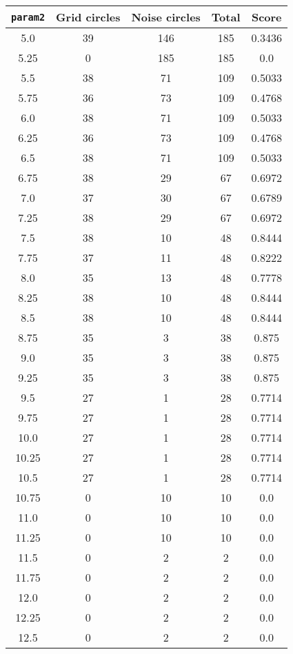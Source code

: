 \documentclass[letterpaper, 12pt]{article}
\begin{document}
\begin{longtable}{|c|c|c|c|c|}
\hline
\textbf{\texttt{param2}} & \textbf{Grid circles} & \textbf{Noise circles} & \textbf{Total} & \textbf{Score} \\
\hline
5.0 & 39 & 146 & 185 & 0.3436 \\
\hline
5.25 & 0 & 185 & 185 & 0.0 \\
\hline
5.5 & 38 & 71 & 109 & 0.5033 \\
\hline
5.75 & 36 & 73 & 109 & 0.4768 \\
\hline
6.0 & 38 & 71 & 109 & 0.5033 \\
\hline
6.25 & 36 & 73 & 109 & 0.4768 \\
\hline
6.5 & 38 & 71 & 109 & 0.5033 \\
\hline
6.75 & 38 & 29 & 67 & 0.6972 \\
\hline
7.0 & 37 & 30 & 67 & 0.6789 \\
\hline
7.25 & 38 & 29 & 67 & 0.6972 \\
\hline
7.5 & 38 & 10 & 48 & 0.8444 \\
\hline
7.75 & 37 & 11 & 48 & 0.8222 \\
\hline
8.0 & 35 & 13 & 48 & 0.7778 \\
\hline
8.25 & 38 & 10 & 48 & 0.8444 \\
\hline
8.5 & 38 & 10 & 48 & 0.8444 \\
\hline
8.75 & 35 & 3 & 38 & 0.875 \\
\hline
9.0 & 35 & 3 & 38 & 0.875 \\
\hline
9.25 & 35 & 3 & 38 & 0.875 \\
\hline
9.5 & 27 & 1 & 28 & 0.7714 \\
\hline
9.75 & 27 & 1 & 28 & 0.7714 \\
\hline
10.0 & 27 & 1 & 28 & 0.7714 \\
\hline
10.25 & 27 & 1 & 28 & 0.7714 \\
\hline
10.5 & 27 & 1 & 28 & 0.7714 \\
\hline
10.75 & 0 & 10 & 10 & 0.0 \\
\hline
11.0 & 0 & 10 & 10 & 0.0 \\
\hline
11.25 & 0 & 10 & 10 & 0.0 \\
\hline
11.5 & 0 & 2 & 2 & 0.0 \\
\hline
11.75 & 0 & 2 & 2 & 0.0 \\
\hline
12.0 & 0 & 2 & 2 & 0.0 \\
\hline
12.25 & 0 & 2 & 2 & 0.0 \\
\hline
12.5 & 0 & 2 & 2 & 0.0 \\

\end{longtable}
\end{document}
